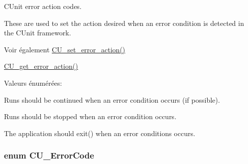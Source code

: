 C\-Unit error action codes. 

These are used to set the action desired when an error condition is detected in the C\-Unit framework. \begin{DoxySeeAlso}{Voir également}
\hyperlink{group__Framework_ga58f4bdc1a05802f89005a487768b3d75}{C\-U\-\_\-set\-\_\-error\-\_\-action()} 

\hyperlink{group__Framework_gab2e98ce95448aa5a04a4875bc8152d6e}{C\-U\-\_\-get\-\_\-error\-\_\-action()} 
\end{DoxySeeAlso}
\begin{Desc}
\item[Valeurs énumérées\-: ]\par
\begin{description}
\item[{\em 
\hypertarget{group__Framework_gga50053b4edbfc96a88027dd57c580ca35a8d128d9f1ef78818816d62dd5d0a7043}{C\-U\-E\-A\-\_\-\-I\-G\-N\-O\-R\-E}\label{group__Framework_gga50053b4edbfc96a88027dd57c580ca35a8d128d9f1ef78818816d62dd5d0a7043}
}]Runs should be continued when an error condition occurs (if possible). \item[{\em 
\hypertarget{group__Framework_gga50053b4edbfc96a88027dd57c580ca35a88e2ea08ccaf759fdd948051b0c156a7}{C\-U\-E\-A\-\_\-\-F\-A\-I\-L}\label{group__Framework_gga50053b4edbfc96a88027dd57c580ca35a88e2ea08ccaf759fdd948051b0c156a7}
}]Runs should be stopped when an error condition occurs. \item[{\em 
\hypertarget{group__Framework_gga50053b4edbfc96a88027dd57c580ca35a5356f9f4514df11bc7543ac8ea71d66b}{C\-U\-E\-A\-\_\-\-A\-B\-O\-R\-T}\label{group__Framework_gga50053b4edbfc96a88027dd57c580ca35a5356f9f4514df11bc7543ac8ea71d66b}
}]The application should exit() when an error conditions occurs. \end{description}
\end{Desc}

\hypertarget{group__Framework_ga743a2a025ee3eb792d7d85f0eea347e6}{
\subsubsection[{C\-U\-\_\-\-Error\-Code}]{\setlength{\rightskip}{0pt plus 5cm}enum {\bf C\-U\-\_\-\-Error\-Code}}}\label{group__Framework_ga743a2a025ee3eb792d7d85f0eea347e6}



